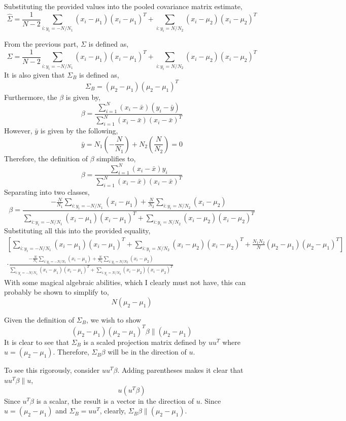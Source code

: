 \documentclass[12pt,twoside]{article}
\begin{document}
\begin{problems}
\begin{problemparts}
\problempart %

Substituting the provided values into the pooled covariance matrix estimate,
$$ \hat{\Sigma} = \frac{1}{N - 2} \sum_{i:y_i = -N/N_1} (x_i - \mu_1) (x_i -
\mu_1)^T + \sum_{i:y_i = N / N_2} (x_i - \mu_2) (x_i - \mu_2)^T $$

\problempart %

From the previous part, $\Sigma$ is defined as,
$$ \Sigma = \frac{1}{N - 2} \sum_{i:y_i = -N/N_1} (x_i - \mu_1) (x_i -
\mu_1)^T + \sum_{i:y_i = N / N_2} (x_i - \mu_2) (x_i - \mu_2)^T $$
It is also given that $\Sigma_B$ is defined as,
$$ \Sigma_B = (\mu_2 - \mu_1) (\mu_2 - \mu_1)^T $$
Furthermore, the $\beta$ is given by,
$$ \beta = \frac{\sum_{i=1}^N (x_i - \bar{x})(y_i - \bar{y})}{\sum_{i=1}^N
(x_i - \bar{x}) (x_i - \bar{x})^T } $$
However, $\bar{y}$ is given by the following,
$$ \bar{y} = N_1 \left(-\frac{N}{N_1}\right) + N_2 \left(\frac{N}{N_2}\right)
= 0 $$
Therefore, the definition of $\beta$ simplifies to,
$$ \beta = \frac{\sum_{i=1}^N (x_i - \bar{x}) y_i}{\sum_{i=1}^N (x_i -
\bar{x}) (x_i - \bar{x})^T } $$
Separating into two classes,
$$ \beta = \frac{-\frac{N}{N_1} \sum_{i:y_i = -N/N_1} (x_i - \mu_1) +
\frac{N}{N_2} \sum_{i:y_i = N/N_2} (x_i - \mu_2)}{\sum_{i:y_i=-N/N_1} (x_i -
\mu_1) (x_i - \mu_1)^T + \sum_{i:y_i=N/N_2} (x_i - \mu_2) (x_i - \mu_2)^T} $$
Substituting all this into the provided equality,
\begin{multline*}
    \left[\sum_{i:y_i = -N/N_1} (x_i - \mu_1) (x_i - \mu_1)^T + \sum_{i:y_i =
    N / N_2} (x_i - \mu_2) (x_i - \mu_2)^T + \frac{N_1 N_2}{N} (\mu_2 -
    \mu_1) (\mu_2 - \mu_1)^T \right] \\
    \cdot \frac{-\frac{N}{N_1} \sum_{i:y_i = -N/N_1} (x_i - \mu_1) +
    \frac{N}{N_2} \sum_{i:y_i = N/N_2} (x_i - \mu_2)}{\sum_{i:y_i=-N/N_1}
    (x_i - \mu_1) (x_i - \mu_1)^T + \sum_{i:y_i=N/N_2} (x_i - \mu_2) (x_i -
    \mu_2)^T}
\end{multline*}
With some magical algebraic abilities, which I clearly must not have, this
can probably be shown to simplify to,
$$ N(\mu_2 - \mu_1) $$

\problempart %

Given the definition of $\Sigma_B$, we wish to show
$$ (\mu_2 - \mu_1) (\mu_2 - \mu_1)^T \beta \parallel (\mu_2 - \mu_1) $$
It is clear to see that $\Sigma_B$ is a scaled projection matrix defined by
$u u^T$ where $u = (\mu_2 - \mu_1)$. Therefore, $\Sigma_B \beta$ will be in
the direction of $u$.

To see this rigorously, consider $u u^T \beta$. Adding parentheses makes it
clear that $u u^T \beta \parallel u$,
$$ u \left(u^T \beta\right) $$
Since $u^T \beta$ is a scalar, the result is a vector in the direction of
$u$. Since $u = (\mu_2 - \mu_1)$ and $\Sigma_B = u u^T$, clearly, $\Sigma_B
\beta \parallel (\mu_2 - \mu_1)$.


\end{problemparts}
\end{problems}
\end{document}
